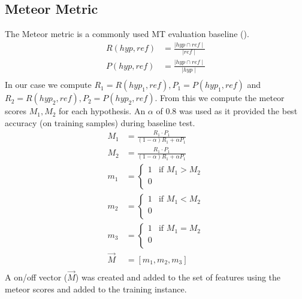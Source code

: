 \documentclass[11pt]{article}
\begin{document}
\subsection{Meteor Metric}
The Meteor metric is a commonly used MT evaluation baseline
(\cite{koehn2010statistical}).
\begin{align*}
R(hyp,ref) &= \frac{\mid hyp \cap ref \mid}{\mid ref \mid}\\
P(hyp,ref) &= \frac{\mid hyp \cap ref \mid}{\mid hyp \mid}\\
\end{align*}
In our case we compute $R_1 = R(hyp_1, ref), P_1 = P(hyp_1,ref)$ and $R_2 =
R(hyp_2, ref), P_2 = P(hyp_2, ref)$. From this we compute the meteor scores
$M_1,M_2$ for each hypothesis. An $\alpha$ of 0.8 was used as it provided the
best accuracy (on training samples) during baseline test.
\begin{align*}
M_1 &= \frac{R_1 \cdot P_1}{(1-\alpha)R_1 + \alpha P_1}\\
M_2 &= \frac{R_1 \cdot P_1}{(1-\alpha)R_1 + \alpha P_1}\\
m_1 &= \begin{cases} 1 &\mbox{if } M_1 > M_2\\
0\\
\end{cases}\\
m_2 &= \begin{cases} 1 &\mbox{if } M_1 < M_2\\
0\\
\end{cases}\\
m_3 &= \begin{cases} 1 &\mbox{if } M_1 = M_2\\
0\\
\end{cases}\\
\vec{M} &= [m_1, m_2, m_3]\\
\end{align*}
A on/off vector ($\vec{M}$) was created and added to the set of features using
the meteor scores and added to the training instance. 
\end{document}
